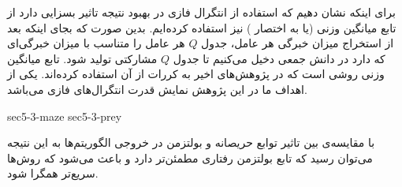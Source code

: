 برای اینکه نشان دهیم که استفاده از انتگرال فازی در بهبود نتیجه تاثیر بسزایی دارد از تابع میانگین وزنی (یا به اختصار ) نیز استفاده کرده‌ایم. بدین صورت که بجای اینکه بعد از استخراج میزان خبرگی هر عامل، جدول $Q$ هر عامل را متناسب با میزان خبرگی‌ای که دارد در دانش جمعی دخیل می‌کنیم تا جدول $Q$ مشارکتی تولید شود. تابع میانگین وزنی روشی است که در پژوهش‌های اخیر به کررات از آن استفاده کرده‌اند. یکی از اهداف ما در این پژوهش نمایش قدرت انتگرال‌های فازی می‌باشد.

{sec5-3-maze}
{sec5-3-prey}

 با مقایسه‌ی بین تاثیر توابع حریصانه و بولتزمن در خروجی الگوریتم‌ها به این نتیجه‌ می‌توان رسید که تابع بولتزمن رفتاری مطمئن‌تر دارد و باعث می‌شود که روش‌ها سریع‌تر همگرا شود.